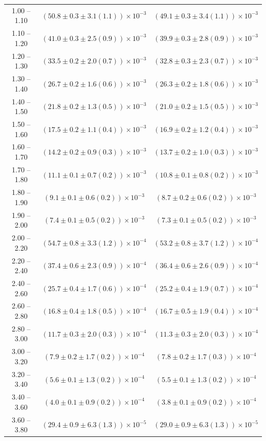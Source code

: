 \begin{table}
\begin{center}
\begin{tabular}{ c | c c }
1.00 -- 1.10 & $(50.8\pm0.3\pm3.1(1.1))\times10^{-3}$ & $(49.1\pm0.3\pm3.4(1.1))\times10^{-3}$ \\ 
1.10 -- 1.20 & $(41.0\pm0.3\pm2.5(0.9))\times10^{-3}$ & $(39.9\pm0.3\pm2.8(0.9))\times10^{-3}$ \\ 
1.20 -- 1.30 & $(33.5\pm0.2\pm2.0(0.7))\times10^{-3}$ & $(32.8\pm0.3\pm2.3(0.7))\times10^{-3}$ \\ 
1.30 -- 1.40 & $(26.7\pm0.2\pm1.6(0.6))\times10^{-3}$ & $(26.3\pm0.2\pm1.8(0.6))\times10^{-3}$ \\ 
1.40 -- 1.50 & $(21.8\pm0.2\pm1.3(0.5))\times10^{-3}$ & $(21.0\pm0.2\pm1.5(0.5))\times10^{-3}$ \\ 
1.50 -- 1.60 & $(17.5\pm0.2\pm1.1(0.4))\times10^{-3}$ & $(16.9\pm0.2\pm1.2(0.4))\times10^{-3}$ \\ 
1.60 -- 1.70 & $(14.2\pm0.2\pm0.9(0.3))\times10^{-3}$ & $(13.7\pm0.2\pm1.0(0.3))\times10^{-3}$ \\ 
1.70 -- 1.80 & $(11.1\pm0.1\pm0.7(0.2))\times10^{-3}$ & $(10.8\pm0.1\pm0.8(0.2))\times10^{-3}$ \\ 
1.80 -- 1.90 & $(9.1\pm0.1\pm0.6(0.2))\times10^{-3}$ & $(8.7\pm0.2\pm0.6(0.2))\times10^{-3}$ \\ 
1.90 -- 2.00 & $(7.4\pm0.1\pm0.5(0.2))\times10^{-3}$ & $(7.3\pm0.1\pm0.5(0.2))\times10^{-3}$ \\ 
2.00 -- 2.20 & $(54.7\pm0.8\pm3.3(1.2))\times10^{-4}$ & $(53.2\pm0.8\pm3.7(1.2))\times10^{-4}$ \\ 
2.20 -- 2.40 & $(37.4\pm0.6\pm2.3(0.9))\times10^{-4}$ & $(36.4\pm0.6\pm2.6(0.9))\times10^{-4}$ \\ 
2.40 -- 2.60 & $(25.7\pm0.4\pm1.7(0.6))\times10^{-4}$ & $(25.2\pm0.4\pm1.9(0.7))\times10^{-4}$ \\ 
2.60 -- 2.80 & $(16.8\pm0.4\pm1.8(0.5))\times10^{-4}$ & $(16.7\pm0.5\pm1.9(0.4))\times10^{-4}$ \\ 
2.80 -- 3.00 & $(11.7\pm0.3\pm2.0(0.3))\times10^{-4}$ & $(11.3\pm0.3\pm2.0(0.3))\times10^{-4}$ \\ 
3.00 -- 3.20 & $(7.9\pm0.2\pm1.7(0.2))\times10^{-4}$ & $(7.8\pm0.2\pm1.7(0.3))\times10^{-4}$ \\ 
3.20 -- 3.40 & $(5.6\pm0.1\pm1.3(0.2))\times10^{-4}$ & $(5.5\pm0.1\pm1.3(0.2))\times10^{-4}$ \\ 
3.40 -- 3.60 & $(4.0\pm0.1\pm0.9(0.2))\times10^{-4}$ & $(3.8\pm0.1\pm0.9(0.2))\times10^{-4}$ \\ 
3.60 -- 3.80 & $(29.4\pm0.9\pm6.3(1.3))\times10^{-5}$ & $(29.0\pm0.9\pm6.3(1.3))\times10^{-5}$ \\ 

\end{tabular}
\end{center}
\end{table}
